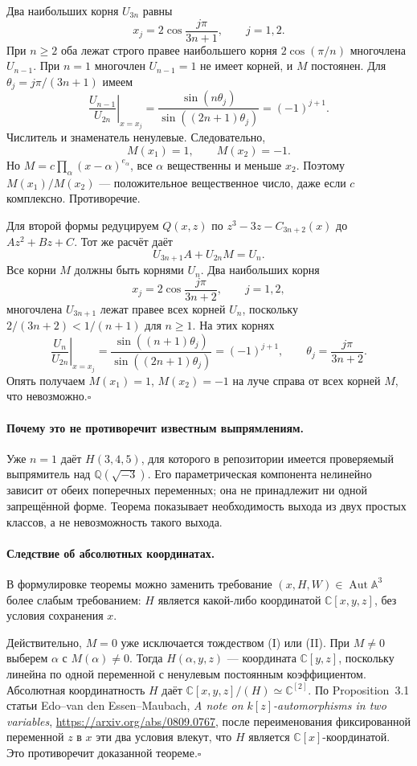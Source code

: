 Два наибольших корня $U_{3n}$ равны
\[
 x_j=2\cos\frac{j\pi}{3n+1},\qquad j=1,2.
\]
При $n\geq2$ оба лежат строго правее наибольшего корня
$2\cos(\pi/n)$ многочлена $U_{n-1}$.
При $n=1$ многочлен $U_{n-1}=1$ не имеет корней, и $M$ постоянен.
Для $\theta_j=j\pi/(3n+1)$ имеем
\[
 \left.\frac{U_{n-1}}{U_{2n}}\right|_{x=x_j}
 =\frac{\sin(n\theta_j)}{\sin((2n+1)\theta_j)}
 =(-1)^{j+1}.
\]
Числитель и знаменатель ненулевые. Следовательно,
\[
 M(x_1)=1,\qquad M(x_2)=-1.
\]
Но $M=c\prod_\alpha(x-\alpha)^{e_\alpha}$, все $\alpha$ вещественны
и меньше $x_2$. Поэтому $M(x_1)/M(x_2)$ --- положительное
вещественное число, даже если $c$ комплексно. Противоречие.

Для второй формы редуцируем $Q(x,z)$ по
$z^3-3z-C_{3n+2}(x)$ до $Az^2+Bz+C$. Тот же расчёт даёт
\[
 \boxed{U_{3n+1}A+U_{2n}M=U_n.} \tag{II}
\]
Все корни $M$ должны быть корнями $U_n$. Два наибольших корня
\[
 x_j=2\cos\frac{j\pi}{3n+2},\qquad j=1,2,
\]
многочлена $U_{3n+1}$ лежат правее всех корней $U_n$, поскольку
$2/(3n+2)<1/(n+1)$ для $n\geq1$. На этих корнях
\[
 \left.\frac{U_n}{U_{2n}}\right|_{x=x_j}
 =\frac{\sin((n+1)\theta_j)}{\sin((2n+1)\theta_j)}
 =(-1)^{j+1},\qquad \theta_j=\frac{j\pi}{3n+2}.
\]
Опять получаем $M(x_1)=1$, $M(x_2)=-1$ на луче справа от всех
корней $M$, что невозможно.\hfill$\square$

\paragraph{Почему это не противоречит известным выпрямлениям.}
Уже $n=1$ даёт $H(3,4,5)$, для которого в репозитории имеется
проверяемый выпрямитель над $\mathbb Q(\sqrt{-3})$.
Его параметрическая компонента нелинейно зависит от обеих
поперечных переменных; она не принадлежит ни одной запрещённой форме.
Теорема показывает необходимость выхода из двух простых классов,
а не невозможность такого выхода.

\paragraph{Следствие об абсолютных координатах.}
В формулировке теоремы можно заменить требование
$(x,H,W)\in\operatorname{Aut}\mathbb A^3$ более слабым требованием:
$H$ является какой-либо координатой $\mathbb C[x,y,z]$,
без условия сохранения $x$.

Действительно, $M=0$ уже исключается тождеством (I) или (II).
При $M\ne0$ выберем $\alpha$ с $M(\alpha)\ne0$.
Тогда $H(\alpha,y,z)$ --- координата $\mathbb C[y,z]$,
поскольку линейна по одной переменной с ненулевым постоянным коэффициентом.
Абсолютная координатность $H$ даёт
$\mathbb C[x,y,z]/(H)\simeq\mathbb C^{[2]}$.
По Proposition~3.1 статьи Edo--van den Essen--Maubach,
\emph{A note on $k[z]$-automorphisms in two variables},
\url{https://arxiv.org/abs/0809.0767},
после переименования фиксированной переменной $z$ в $x$ эти два
условия влекут, что $H$ является $\mathbb C[x]$-координатой.
Это противоречит доказанной теореме.\hfill$\square$

